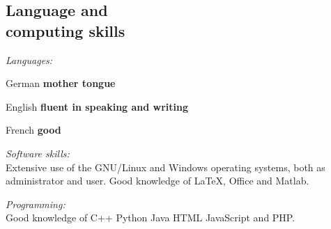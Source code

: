 \documentclass[a4paper,margin,line,useAMS,usenatbib]{resume}
\def\tb{\textbullet\;}
\begin{document}
\begin{resume}
\section{\mysidestyle Language and\\ computing skills}

{\it Languages:}
\begin{list2}
  \item German       \hfill {\bf mother tongue}
  \item English      \hfill {\bf fluent in speaking and writing}
  \item French       \hfill {\bf good}
\end{list2}

{\it Software skills:}\\
Extensive use of the \tb GNU/Linux and \tb Windows operating systems, both as administrator and user. Good knowledge of \tb \LaTeX, \tb Office and \tb Matlab.

{\it Programming:}\\
Good knowledge of \tb C++ \tb Python \tb Java \tb HTML \tb JavaScript and \tb PHP.

%




\end{resume}
\end{document}
